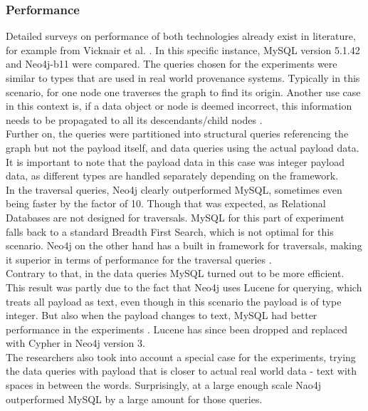 \subsubsection{Performance} \label{sec:graphdb:performance}
Detailed surveys on performance of both technologies already exist in literature, for example from Vicknair et al. \autocite{Vicknair2010}. In this specific instance, MySQL version 5.1.42 and Neo4j-b11 were compared.
The queries chosen for the experiments were similar to types that are used in real world provenance systems. Typically in this scenario, for one node one traverses the graph to find its origin. Another use case in this context is, if a data object or node is deemed incorrect, this information needs to be propagated to all its descendants/child nodes \autocite{Vicknair2010}.\\
Further on, the queries were partitioned into structural queries referencing the graph but not the payload itself, and data queries using the actual payload data. It is important to note that the payload data in this case was integer payload data, as different types are handled separately depending on the framework.\\
In the traversal queries, Neo4j clearly outperformed MySQL, sometimes even being faster by the factor of 10. Though that was expected, as Relational Databases are not designed for traversals. MySQL for this part of experiment falls back to a standard Breadth First Search, which is not optimal for this scenario. Neo4j on the other hand has a built in framework for traversals, making it superior in terms of performance for the traversal queries \autocite{Vicknair2010}. \\
Contrary to that, in the data queries MySQL turned out to be more efficient. This result was partly due to the fact that Neo4j uses Lucene for querying, which treats all payload as text, even though in this scenario the payload is of type integer. But also when the payload changes to text, MySQL had better performance in the experiments \autocite{Vicknair2010}. Lucene has since been dropped and replaced with Cypher in Neo4j version 3.\\
The researchers also took into account a special case for the experiments, trying the data queries with payload that is closer to actual real world data - text with spaces in between the words. Surprisingly, at a large enough scale Nao4j outperformed MySQL by a large amount for those queries.

